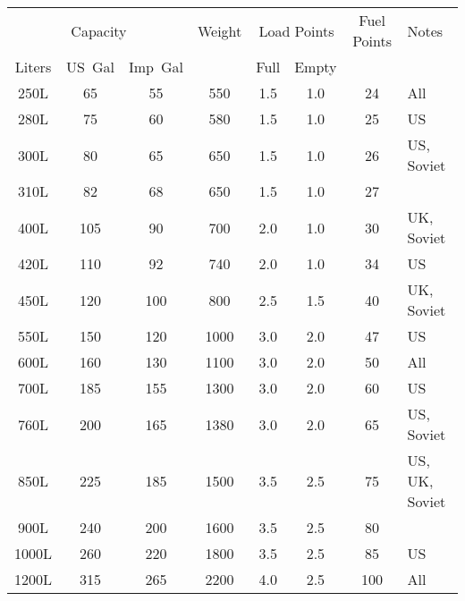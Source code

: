 \begin{twocolumntablefloat}
\begin{twocolumntable}
{
\begin{tabular}{cccccccl}
\toprule
\multicolumn{3}{c}{Capacity}&
Weight&
\multicolumn{2}{c}{Load Points}&
Fuel Points&
Notes\\
\cmidrule{1-3}
\cmidrule{5-6}
Liters&US~Gal&Imp~Gal&&Full&Empty&&\\
\midrule
\phantom{00}250L&\phantom{00}65&\phantom{00}55&\phantom{00}550&\phantom{0}1.5&\phantom{0}1.0&\phantom{0}24&All\\
\phantom{00}280L&\phantom{00}75&\phantom{00}60&\phantom{00}580&\phantom{0}1.5&\phantom{0}1.0&\phantom{0}25&US\\
\phantom{00}300L&\phantom{00}80&\phantom{00}65&\phantom{00}650&\phantom{0}1.5&\phantom{0}1.0&\phantom{0}26&US, Soviet\\
\phantom{00}310L&\phantom{00}82&\phantom{00}68&\phantom{00}650&\phantom{0}1.5&\phantom{0}1.0&\phantom{0}27&\\
\phantom{00}400L&\phantom{0}105&\phantom{00}90&\phantom{00}700&\phantom{0}2.0&\phantom{0}1.0&\phantom{0}30&UK, Soviet\\
\phantom{00}420L&\phantom{0}110&\phantom{00}92&\phantom{00}740&\phantom{0}2.0&\phantom{0}1.0&\phantom{0}34&US\\
\phantom{00}450L&\phantom{0}120&\phantom{0}100&\phantom{00}800&\phantom{0}2.5&\phantom{0}1.5&\phantom{0}40&UK, Soviet\\
\phantom{00}550L&\phantom{0}150&\phantom{0}120&\phantom{0}1000&\phantom{0}3.0&\phantom{0}2.0&\phantom{0}47&US\\
\phantom{00}600L&\phantom{0}160&\phantom{0}130&\phantom{0}1100&\phantom{0}3.0&\phantom{0}2.0&\phantom{0}50&All\\
\phantom{00}700L&\phantom{0}185&\phantom{0}155&\phantom{0}1300&\phantom{0}3.0&\phantom{0}2.0&\phantom{0}60&US\\
\phantom{00}760L&\phantom{0}200&\phantom{0}165&\phantom{0}1380&\phantom{0}3.0&\phantom{0}2.0&\phantom{0}65&US, Soviet\\
\phantom{00}850L&\phantom{0}225&\phantom{0}185&\phantom{0}1500&\phantom{0}3.5&\phantom{0}2.5&\phantom{0}75&US, UK, Soviet\\
\phantom{00}900L&\phantom{0}240&\phantom{0}200&\phantom{0}1600&\phantom{0}3.5&\phantom{0}2.5&\phantom{0}80&\\
\phantom{0}1000L&\phantom{0}260&\phantom{0}220&\phantom{0}1800&\phantom{0}3.5&\phantom{0}2.5&\phantom{0}85&US\\
\phantom{0}1200L&\phantom{0}315&\phantom{0}265&\phantom{0}2200&\phantom{0}4.0&\phantom{0}2.5&\phantom{}100&All\\

\end{tabular}}
\end{twocolumntable}
\end{twocolumntablefloat}
